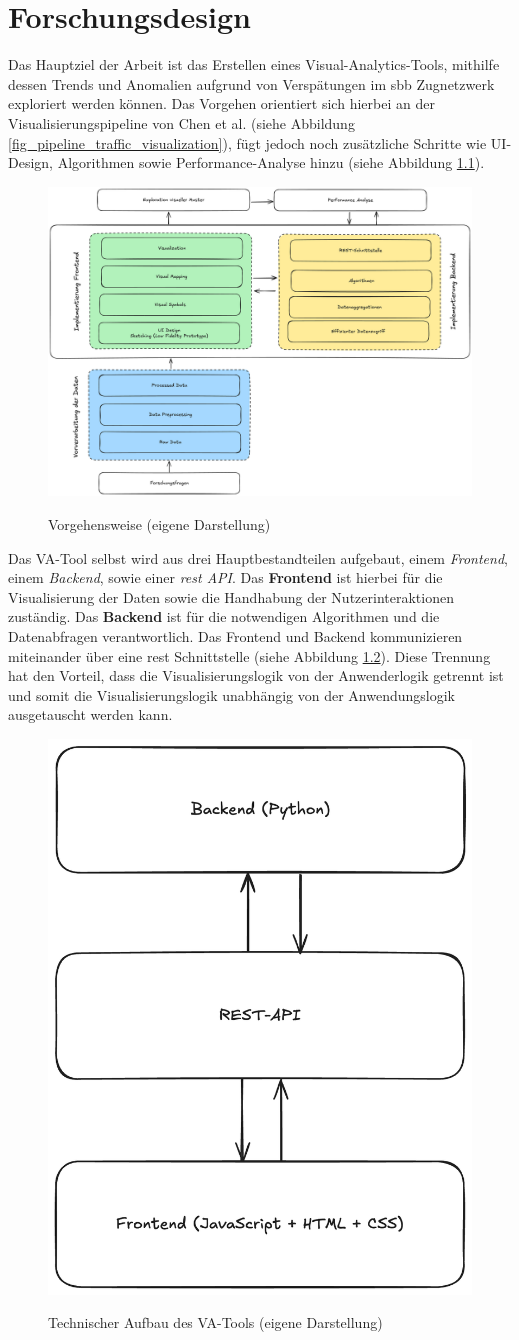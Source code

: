 \chapter{Forschungsdesign}
\label{kap:forschungsdesign}
Das Hauptziel der Arbeit ist das Erstellen eines Visual-Analytics-Tools, mithilfe dessen Trends und Anomalien aufgrund von Verspätungen im \acrshort{sbb} Zugnetzwerk exploriert werden können. Das Vorgehen orientiert sich hierbei an der Visualisierungspipeline von Chen et al. (siehe Abbildung \ref{fig_pipeline_traffic_visualization}), fügt jedoch noch zusätzliche Schritte wie UI-Design, Algorithmen sowie Performance-Analyse hinzu (siehe Abbildung \ref{fig_vorgehen}).

\begin{figure}[H]
    \caption{Vorgehensweise (eigene Darstellung)}
    \includegraphics[width=.8\linewidth]{content/00_assets/vorgehen.png}
    \label{fig_vorgehen}
\end{figure}


Das VA-Tool selbst wird aus drei Hauptbestandteilen aufgebaut, einem \textit{Frontend}, einem \textit{Backend}, sowie einer \textit{\acrfull{rest} API}. Das \textbf{Frontend} ist hierbei für die Visualisierung der Daten sowie die Handhabung der Nutzerinteraktionen zuständig. Das \textbf{Backend} ist für die notwendigen Algorithmen und die Datenabfragen verantwortlich. Das Frontend und Backend kommunizieren miteinander über eine  \acrshort{rest} Schnittstelle (siehe Abbildung \ref{fig_va_tool_design}). Diese Trennung hat den Vorteil, dass die Visualisierungslogik von der Anwenderlogik getrennt ist und somit die Visualisierungslogik unabhängig von der Anwendungslogik ausgetauscht werden kann.

\begin{figure}[H]
    \caption{Technischer Aufbau des VA-Tools (eigene Darstellung)}
    \includegraphics[width=.3\linewidth]{content/00_assets/aufbau_va_tool.png}
    \label{fig_va_tool_design}
\end{figure}

